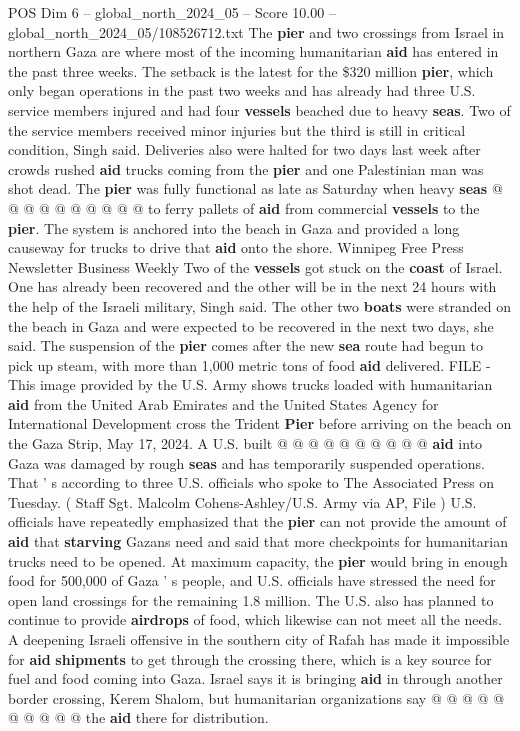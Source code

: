 \begin{textsample}{POS Dim 6 – global\_north\_2024\_05 – Score 10.00 – global\_north\_2024\_05/108526712.txt}
The \textbf{pier} and two crossings from Israel in northern Gaza are where most of the incoming humanitarian \textbf{aid} has entered in the past three weeks.
The setback is the latest for the \$320 million \textbf{pier}, which only began operations in the past two weeks and has already had three U.S. service members injured and had four \textbf{vessels} beached due to heavy \textbf{seas}.
Two of the service members received minor injuries but the third is still in critical condition, Singh said.
Deliveries also were halted for two days last week after crowds rushed \textbf{aid} trucks coming from the \textbf{pier} and one Palestinian man was shot dead.
The \textbf{pier} was fully functional as late as Saturday when heavy \textbf{seas} @ @ @ @ @ @ @ @ @ @ to ferry pallets of \textbf{aid} from commercial \textbf{vessels} to the \textbf{pier}.
The system is anchored into the beach in Gaza and provided a long causeway for trucks to drive that \textbf{aid} onto the shore.
Winnipeg Free Press Newsletter Business Weekly Two of the \textbf{vessels} got stuck on the \textbf{coast} of Israel.
One has already been recovered and the other will be in the next 24 hours with the help of the Israeli military, Singh said.
The other two \textbf{boats} were stranded on the beach in Gaza and were expected to be recovered in the next two days, she said.
The suspension of the \textbf{pier} comes after the new \textbf{sea} route had begun to pick up steam, with more than 1,000 metric tons of food \textbf{aid} delivered.
FILE - This image provided by the U.S.
Army shows trucks loaded with humanitarian \textbf{aid} from the United Arab Emirates and the United States Agency for International Development cross the Trident \textbf{Pier} before arriving on the beach on the Gaza Strip, May 17, 2024.
A U.S. built @ @ @ @ @ @ @ @ @ @ \textbf{aid} into Gaza was damaged by rough \textbf{seas} and has temporarily suspended operations.
That ' s according to three U.S. officials who spoke to The Associated Press on Tuesday. ( Staff Sgt.
Malcolm Cohens-Ashley/U.S.
Army via AP, File ) U.S. officials have repeatedly emphasized that the \textbf{pier} can not provide the amount of \textbf{aid} that \textbf{starving} Gazans need and said that more checkpoints for humanitarian trucks need to be opened.
At maximum capacity, the \textbf{pier} would bring in enough food for 500,000 of Gaza ' s people, and U.S. officials have stressed the need for open land crossings for the remaining 1.8 million.
The U.S. also has planned to continue to provide \textbf{airdrops} of food, which likewise can not meet all the needs.
A deepening Israeli offensive in the southern city of Rafah has made it impossible for \textbf{aid} \textbf{shipments} to get through the crossing there, which is a key source for fuel and food coming into Gaza.
Israel says it is bringing \textbf{aid} in through another border crossing, Kerem Shalom, but humanitarian organizations say @ @ @ @ @ @ @ @ @ @ the \textbf{aid} there for distribution.

\end{textsample}
